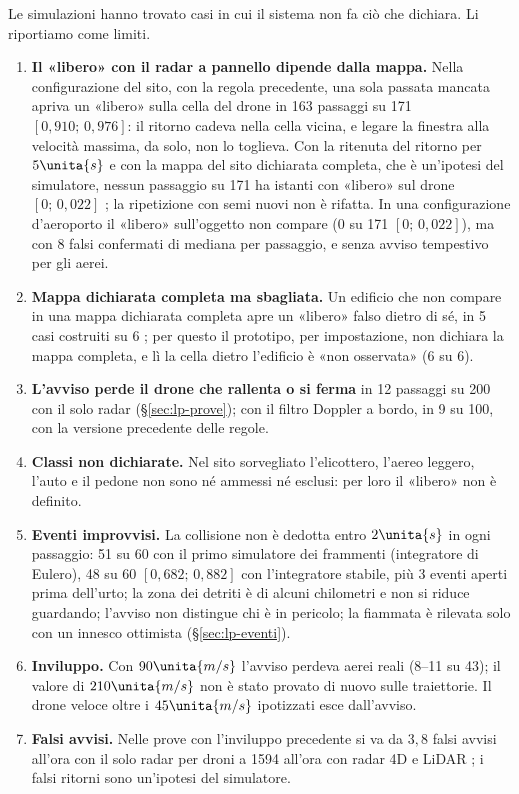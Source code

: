 Le simulazioni hanno trovato casi in cui il sistema non fa ciò che dichiara. Li riportiamo come limiti.
\begin{enumerate}[label=\arabic*.]
\item \textbf{Il «libero» con il radar a pannello dipende dalla mappa.} Nella configurazione del sito, con la regola precedente, una sola passata mancata apriva un «libero» sulla cella del drone in 163 passaggi su 171 $[0{,}910;\,0{,}976]$: il ritorno cadeva nella cella vicina, e legare la finestra alla velocità massima, da solo, non lo toglieva. Con la ritenuta del ritorno per $5\unita{s}$ e con la mappa del sito dichiarata completa, che è un'ipotesi del simulatore, nessun passaggio su 171 ha istanti con «libero» sul drone $[0;\,0{,}022]$ ; la ripetizione con semi nuovi non è rifatta. In una configurazione d'aeroporto il «libero» sull'oggetto non compare (0 su 171 $[0;\,0{,}022]$), ma con 8 falsi confermati di mediana per passaggio, e senza avviso tempestivo per gli aerei.
\item \textbf{Mappa dichiarata completa ma sbagliata.} Un edificio che non compare in una mappa dichiarata completa apre un «libero» falso dietro di sé, in 5 casi costruiti su 6 ; per questo il prototipo, per impostazione, non dichiara la mappa completa, e lì la cella dietro l'edificio è «non osservata» (6 su 6).
\item \textbf{L'avviso perde il drone che rallenta o si ferma} in 12 passaggi su 200 con il solo radar (\S\ref{sec:lp-prove}); con il filtro Doppler a bordo, in 9 su 100, con la versione precedente delle regole.
\item \textbf{Classi non dichiarate.} Nel sito sorvegliato l'elicottero, l'aereo leggero, l'auto e il pedone non sono né ammessi né esclusi: per loro il «libero» non è definito.
\item \textbf{Eventi improvvisi.} La collisione non è dedotta entro $2\unita{s}$ in ogni passaggio: 51 su 60 con il primo simulatore dei frammenti (integratore di Eulero), 48 su 60 $[0{,}682;\,0{,}882]$ con l'integratore stabile, più 3 eventi aperti prima dell'urto; la zona dei detriti è di alcuni chilometri e non si riduce guardando; l'avviso non distingue chi è in pericolo; la fiammata è rilevata solo con un innesco ottimista (\S\ref{sec:lp-eventi}).
\item \textbf{Inviluppo.} Con $90\unita{m/s}$ l'avviso perdeva aerei reali (8--11 su 43); il valore di $210\unita{m/s}$ non è stato provato di nuovo sulle traiettorie. Il drone veloce oltre i $45\unita{m/s}$ ipotizzati esce dall'avviso.
\item \textbf{Falsi avvisi.} Nelle prove con l'inviluppo precedente si va da $3{,}8$ falsi avvisi all'ora con il solo radar per droni a 1594 all'ora con radar 4D e LiDAR ; i falsi ritorni sono un'ipotesi del simulatore.
\end{enumerate}

